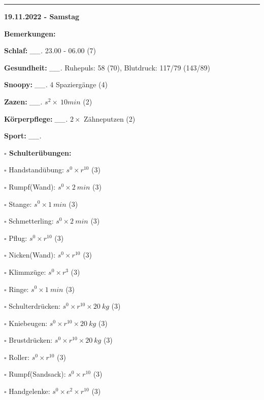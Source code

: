 \documentclass[10pt,a4paper]{article}
\newcommand\prop[1] {{\color {alizarin} {\bf #1}}}             %
\newcommand\rele[1] {{\color {english} \bf {#1}}}              %
\newcommand\mand[1] {{\color {burntorange} {\bf #1}}}          %
\newcommand\ddivide {\vskip -9pt \hrule \vskip 6pt}
\newcommand\topspace{\vskip -15pt \hskip 20pt}
\newcommand\n[1] { {\sl #1.} \hskip 5pt }
\begin{document}
\ddivide
{\rele {19.11.2022 - Samstag}}

\begin{mdframed}[style=daystyle]
  \begin{labeling}{{\mand {Bemerkungen:}}}
    \setlength\itemsep{-3pt}
  \item[{\mand {Schlaf:}}]       \n{\_\_} 23.00 - 06.00 (7)
  \item[{\mand {Gesundheit:}}]   \n{\_\_} Ruhepuls: 58 (70), Blutdruck: 117/79 (143/89)
  \item[{\mand {Snoopy:}}]       \n{\_\_} 4 Spaziergänge (4)  
  \item[{\mand {Zazen:}}]        \n{\_\_} $s^2 \times\ 10 min$ (2)
  \item[{\mand {Körperpflege:}}] \n{\_\_} $2 \times$ Zähneputzen (2)
  \item[{\mand {Sport:}}]        \n{\_\_}
    \topspace
    \begin{minipage}{0.75\textwidth}  
      \begin{labeling}{\prop {$\square$ {Schulterübungen:}}} 
        \setlength\itemsep{-3pt}
      \item[$\square$ Handstandübung:]  $s^0 \times r^{10}$ (3)
      \item[$\square$ Rumpf(Wand):]     $s^0 \times 2\ min$ (3)
      \item[$\square$ Stange:]          $s^0 \times 1\ min$ (3)
      \item[$\square$ Schmetterling:]   $s^0 \times 2\ min$ (3)
      \item[$\square$ Pflug:]           $s^0 \times r^{10}$ (3)
      \item[$\square$ Nicken(Wand):]    $s^0 \times r^{10}$ (3)
      \item[$\square$ Klimmzüge:]       $s^0 \times r^3$ (3)
      \item[$\square$ Ringe:]           $s^0 \times 1\ min$ (3)
      \item[$\square$ Schulterdrücken:] $s^0 \times r^{10} \times 20\ kg$ (3)
      \item[$\square$ Kniebeugen:]      $s^0 \times r^{10} \times 20\ kg$ (3)
      \item[$\square$ Brustdrücken:]    $s^0 \times r^{10} \times 20\ kg$ (3)
      \item[$\square$ Roller:]          $s^0 \times r^{10}$ (3)
      \item[$\square$ Rumpf(Sandsack):] $s^0 \times r^{10}$ (3)
      \item[$\square$ Handgelenke:]     $s^0 \times e^2 \times r^{10}$ (3)

\end{labeling}
\end{minipage}
\end{labeling}
\end{mdframed}
\end{document}
